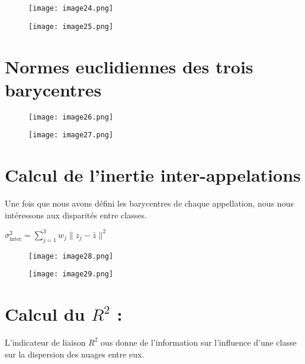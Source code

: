 \documentclass{article}
\begin{document}
\begin{figure}[H]
    \centering
    \texttt{[image: image24.png]}
    \label{fig:enter-label}
\end{figure}

\begin{figure}[H]
    \centering
    \texttt{[image: image25.png]}
    \label{fig:enter-label}
\end{figure}


\section{Normes euclidiennes des trois barycentres}

\begin{figure}[H]
    \centering
    \texttt{[image: image26.png]}
    \label{fig:enter-label}
\end{figure}

\begin{figure}[H]
    \centering
    \texttt{[image: image27.png]}
    \label{fig:enter-label}
\end{figure}

\section{Calcul de l'inertie inter-appelations}

Une fois que nous avons défini les barycentres de chaque appellation, nous nous intéressons aux disparités entre classes.
\begin{center}
    \textbf{$\sigma^2_{\text{inter}} = \sum_{j=1}^{3} w_j\|z_j - \bar{z}\|^2$}
\end{center}

\begin{figure}[H]
    \centering
    \texttt{[image: image28.png]}
    \label{fig:enter-label}
\end{figure}

\begin{figure}[H]
    \centering
    \texttt{[image: image29.png]}
    \label{fig:enter-label}
\end{figure}

\section{Calcul du $R^{2}$ : }

L'indicateur de liaison  $R^{2}$ ous donne de l'information sur l'influence d'une classe sur la dispersion des nuages entre eux.
\end{document}
